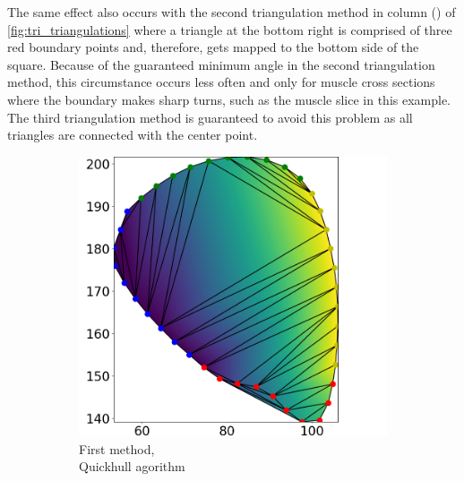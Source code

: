 The same effect also occurs with the second triangulation method in column () of \cref{fig:tri_triangulations} where a triangle at the bottom right is comprised of three red boundary points and, therefore, gets mapped to the bottom side of the square. Because of the guaranteed minimum angle in the second triangulation method, this circumstance occurs less often and only for muscle cross sections where the boundary makes sharp turns, such as the muscle slice in this example. The third triangulation method is guaranteed to avoid this problem as all triangles are connected with the center point.

\begin{figure}%
  \centering%
  \begin{subfigure}[t]{0.31\textwidth}%
    \centering%
    \includegraphics[width=\textwidth]{images/fiber_creation/u_0.png}%
    \caption{First method,\\Quickhull agorithm}%
    \label{fig:triu_0}%
  \end{subfigure}
  \quad
  \begin{subfigure}[t]{0.31\textwidth}%
    \centering%

\end{subfigure}
\end{figure}
